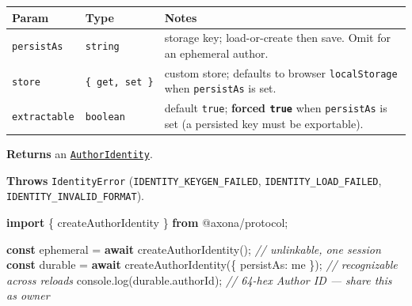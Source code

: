 \documentclass[
  nobib]{tufte-handout}
\newenvironment{Shaded}{}{}
\newcommand{\AttributeTok}[1]{\textcolor[rgb]{0.49,0.56,0.16}{#1}}
\newcommand{\BuiltInTok}[1]{\textcolor[rgb]{0.00,0.50,0.00}{#1}}
\newcommand{\CommentTok}[1]{\textcolor[rgb]{0.38,0.63,0.69}{\textit{#1}}}
\newcommand{\ControlFlowTok}[1]{\textcolor[rgb]{0.00,0.44,0.13}{\textbf{#1}}}
\newcommand{\DataTypeTok}[1]{\textcolor[rgb]{0.56,0.13,0.00}{#1}}
\newcommand{\FunctionTok}[1]{\textcolor[rgb]{0.02,0.16,0.49}{#1}}
\newcommand{\ImportTok}[1]{\textcolor[rgb]{0.00,0.50,0.00}{\textbf{#1}}}
\newcommand{\KeywordTok}[1]{\textcolor[rgb]{0.00,0.44,0.13}{\textbf{#1}}}
\newcommand{\NormalTok}[1]{#1}
\newcommand{\OperatorTok}[1]{\textcolor[rgb]{0.40,0.40,0.40}{#1}}
\newcommand{\StringTok}[1]{\textcolor[rgb]{0.25,0.44,0.63}{#1}}
\newcounter{none} %
\begin{document}
{\def\LTcaptype{none} %
\begin{longtable}[]{@{}
  >{\raggedright\arraybackslash}p{}
  >{\raggedright\arraybackslash}p{}
  >{\raggedright\arraybackslash}p{}@{}}
\toprule\noalign{}
\begin{minipage}[b]{\linewidth}\raggedright
Param
\end{minipage} & \begin{minipage}[b]{\linewidth}\raggedright
Type
\end{minipage} & \begin{minipage}[b]{\linewidth}\raggedright
Notes
\end{minipage} \\
\midrule\noalign{}
\endhead
\bottomrule\noalign{}
\endlastfoot
\texttt{persistAs} & \texttt{string} & storage key; load-or-create then
save. Omit for an ephemeral author. \\
\texttt{store} & \texttt{\{\ get,\ set\ \}} & custom store; defaults to
browser \texttt{localStorage} when \texttt{persistAs} is set. \\
\texttt{extractable} & \texttt{boolean} & default \texttt{true};
\textbf{forced \texttt{true}} when \texttt{persistAs} is set (a
persisted key must be exportable). \\
\end{longtable}
}

\textbf{Returns} an
\hyperref[author-identity-type]{\texttt{AuthorIdentity}}.

\textbf{Throws} \texttt{IdentityError}
(\texttt{IDENTITY\_KEYGEN\_FAILED}, \texttt{IDENTITY\_LOAD\_FAILED},
\texttt{IDENTITY\_INVALID\_FORMAT}).

\begin{Shaded}
\begin{Highlighting}[]
\ImportTok{import}\NormalTok{ \{ createAuthorIdentity \} }\ImportTok{from} \StringTok{\textquotesingle{}@axona/protocol\textquotesingle{}}\OperatorTok{;}

\KeywordTok{const}\NormalTok{ ephemeral }\OperatorTok{=} \ControlFlowTok{await} \FunctionTok{createAuthorIdentity}\NormalTok{()}\OperatorTok{;}              \CommentTok{// unlinkable, one session}
\KeywordTok{const}\NormalTok{ durable   }\OperatorTok{=} \ControlFlowTok{await} \FunctionTok{createAuthorIdentity}\NormalTok{(\{ }\DataTypeTok{persistAs}\OperatorTok{:} \StringTok{\textquotesingle{}me\textquotesingle{}}\NormalTok{ \})}\OperatorTok{;} \CommentTok{// recognizable across reloads}
\BuiltInTok{console}\OperatorTok{.}\FunctionTok{log}\NormalTok{(durable}\OperatorTok{.}\AttributeTok{authorId}\NormalTok{)}\OperatorTok{;}   \CommentTok{// 64{-}hex Author ID — share this as \textasciigrave{}owner\textasciigrave{}}
\end{Highlighting}
\end{Shaded}
\end{document}
